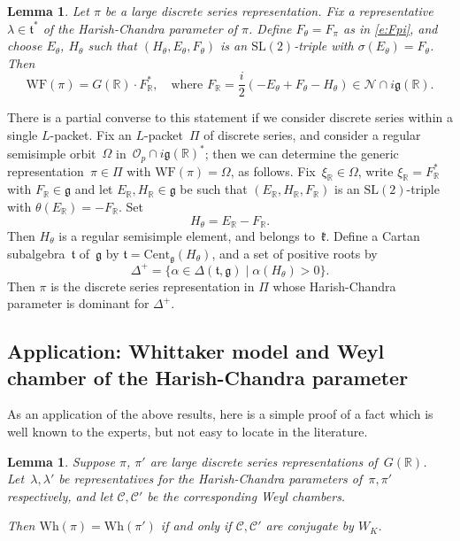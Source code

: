\documentclass[10pt,leqno]{article}
\newtheorem{lemma}[equation]{Lemma}
\numberwithin{equation}{section}
\newcommand{\Cent}{\mathrm{Cent}}
\renewcommand{\O}{\mathcal O}
\newcommand{\R}{\mathbb R}
\newcommand{\N}{\mathcal N}
\renewcommand{\k}{\mathfrak k}
\renewcommand{\t}{\mathfrak t}
\newcommand{\g}{\mathfrak g}
\newcommand{\Wh}{\mathrm{Wh}}
\newcommand{\WF}{\mathrm{WF}}
\newcommand{\Op}{\O_p}
\begin{document}
\begin{lemma}\label{lem:explicit_WF}
  Let $\pi$ be a large discrete series representation. Fix a representative  $\lambda\in \t^*$ of the Harish-Chandra parameter of $\pi$.
Define $F_\theta=F_\pi$ as in \eqref{e:Fpi}, and choose  $E_\theta$, $H_\theta$ such that $(H_\theta,E_\theta,F_\theta)$ is an $\mathrm{SL}(2)$-triple with $\sigma(E_\theta)=F_\theta$.  Then
$$
\WF(\pi)=G(\R)\cdot F_\R^\ast, \quad \text{where $F_\R = \frac i2(-E_\theta+F_\theta-H_\theta)\in\N\cap i\g(\R)$.}
$$\end{lemma}
There is a partial converse to this statement if we consider discrete series within a single $L$-packet. Fix an $L$-packet~$\Pi$ of discrete series, and consider a regular semisimple orbit~$\Omega$ in~$\Op \cap i\g(\R)^\ast$; then we can determine the generic representation~$\pi \in \Pi$ with $\WF(\pi)=\Omega$, as follows. Fix~$\xi_\R \in \Omega$, write $\xi_\R=F_\R^\ast$ with $F_\R \in \g$ and let $E_\R, H_\R \in \g$ be such that $(E_\R, H_\R, F_\R)$ is an  $\mathrm{SL}(2)$-triple with $\theta(E_\R)=-F_\R$. Set
$$
H_\theta=E_\R-F_\R.
$$
Then $H_\theta$ is a regular semisimple element, and belongs to~$\k$.
Define a Cartan subalgebra~$\t$ of~$\g$ by $\t=\Cent_{\g}(H_\theta)$, and a set of positive roots by
$$
\Delta^+=\{\alpha\in\Delta(\t,\g)\mid  \alpha(H_\theta)>0\}.
$$
Then $\pi$ is the discrete series representation in $\Pi$ whose Harish-Chandra parameter is dominant for $\Delta^+$. 

\subsection{Application: Whittaker model and Weyl chamber of the Harish-Chandra parameter}

As an application of the above results, here is a simple proof of a fact which is well known to the experts, but not easy to locate in the literature.

\begin{lemma}
\label{l:equalWhittaker}
Suppose $\pi$, $\pi'$ are large discrete series representations of~$G(\R)$. Let~$\lambda, \lambda'$ be representatives for the Harish-Chandra parameters of~$\pi, \pi'$ respectively, and let $\mathscr{C}, \mathscr{C}'$ be the corresponding Weyl chambers. 

Then $\Wh(\pi)=\Wh(\pi')$ if and only if $\mathscr{C}, \mathscr{C}'$ are conjugate by $W_K$.
\end{lemma}
\end{document}
